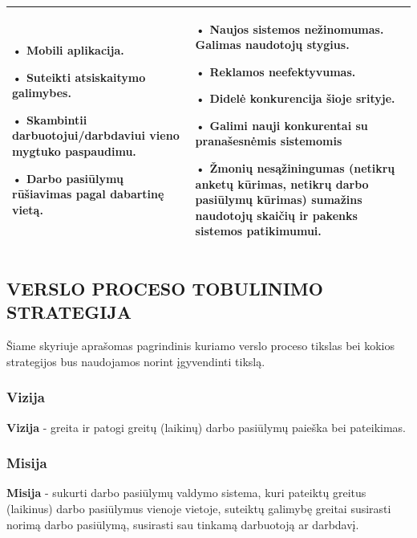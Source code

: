 \documentclass{VUMIFPSkursinis}
\begin{document}
\begin{table}[H]
\begin{tabular}{|p{8cm}|p{8cm}|}
{•	Mobili aplikacija.

•	Suteikti atsiskaitymo galimybes. 

•	Skambintii darbuotojui/darbdaviui vieno mygtuko paspaudimu.

•	Darbo pasiūlymų rūšiavimas pagal dabartinę vietą.

}&\multicolumn{1}{m{8cm}|}{
•	Naujos sistemos nežinomumas. Galimas naudotojų stygius.

•	Reklamos neefektyvumas.

•	Didelė konkurencija šioje srityje.

•	Galimi nauji konkurentai su pranašesnėmis sistemomis

•	Žmonių nesąžiningumas (netikrų anketų kūrimas, netikrų darbo pasiūlymų kūrimas) sumažins naudotojų skaičių ir pakenks sistemos patikimumui.

}\\ \hline

\end{tabular}
\end{table}

\newpage
\subsection{VERSLO PROCESO TOBULINIMO STRATEGIJA}
Šiame skyriuje aprašomas pagrindinis kuriamo verslo proceso tikslas bei kokios strategijos bus naudojamos norint įgyvendinti tikslą.

\subsubsection{Vizija}
\textbf{Vizija}  - greita ir patogi greitų (laikinų) darbo pasiūlymų paieška bei pateikimas.

\subsubsection{Misija}
\textbf{Misija}  - sukurti darbo pasiūlymų valdymo sistema, kuri pateiktų greitus (laikinus) darbo pasiūlymus vienoje vietoje, suteiktų galimybę greitai susirasti norimą darbo pasiūlymą, susirasti sau tinkamą darbuotoją ar darbdavį.
\end{document}
